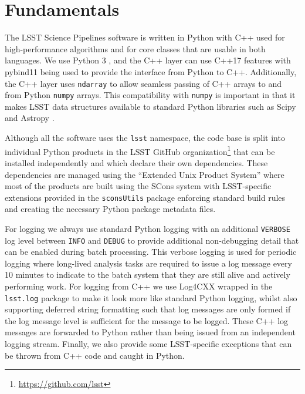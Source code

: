\section{Fundamentals}
\label{sec:support}

The LSST Science Pipelines software is written in Python with C++ used for high-performance algorithms and for core classes that are usable in both languages.
We use Python 3 \citep[having ported from python 2,][currently with a minimum version of Python 3.12]{2020ASPC..522..541J}, and the C++ layer can use C++17 features with pybind11 being used to provide the interface from Python to C++.
Additionally, the C++ layer uses \texttt{ndarray} to allow seamless passing of C++ arrays to and from Python \texttt{numpy} arrays.
This compatibility with \texttt{numpy} is important in that it makes LSST data structures available to standard Python libraries such as Scipy and Astropy \citep{2016SPIE.9913E..0GJ,2018AJ....156..123A}.

Although all the software uses the \texttt{lsst} namespace, the code base is split into individual Python products in the LSST GitHub organization\footnote{\url{https://github.com/lsst}} that can be installed independently and which declare their own dependencies.
These dependencies are managed using the ``Extended Unix Product System'' \citep[EUPS;][]{EUPS,2018SPIE10707E..09J} where
most of the products are built using the SCons system \citep{2005Scons1377085} with LSST-specific extensions provided in the \texttt{sconsUtils} package enforcing standard build rules and creating the necessary Python package metadata files.

For logging we always use standard Python logging with an additional \texttt{VERBOSE} log level between \texttt{INFO} and \texttt{DEBUG} to provide additional non-debugging detail that can be enabled during batch processing.
This verbose logging is used for periodic logging where long-lived analysis tasks are required to issue a log message every 10 minutes to indicate to the batch system that they are still alive and actively performing work.
For logging from C++ we use Log4CXX wrapped in the \texttt{lsst.log} package to make it look more like standard Python logging, whilst also supporting deferred string formatting such that log messages are only formed if the log message level is sufficient for the message to be logged.
These C++ log messages are forwarded to Python rather than being issued from an independent logging stream.
Finally, we also provide some LSST-specific exceptions that can be thrown from C++ code and caught in Python.

